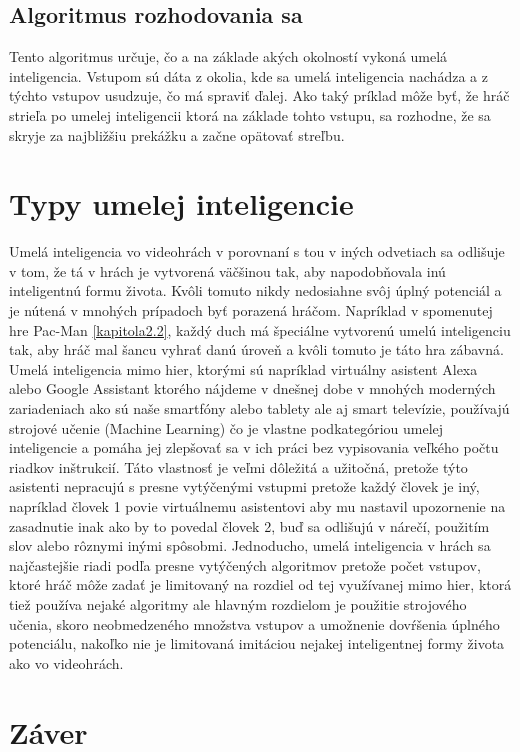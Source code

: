 \documentclass[10pt,oneside,slovak,a4paper]{article}
\begin{document}
\subsection{Algoritmus rozhodovania sa} \label{kapitola3.2}
Tento algoritmus určuje, čo a na základe akých okolností vykoná umelá inteligencia. Vstupom sú dáta z okolia, kde sa umelá inteligencia nachádza a z týchto vstupov usudzuje, čo má spraviť ďalej. Ako taký príklad môže byť, že hráč strieľa po umelej inteligencii ktorá na základe tohto vstupu, sa rozhodne, že sa skryje za najbližšiu prekážku a začne opätovať streľbu.


\section{Typy umelej inteligencie} \label{kapitola4}
Umelá inteligencia vo videohrách v porovnaní s tou v iných odvetiach sa odlišuje v tom, že tá v hrách je vytvorená väčšinou tak, aby napodobňovala inú inteligentnú formu života. Kvôli tomuto nikdy nedosiahne svôj úplný potenciál a je nútená v mnohých prípadoch byť porazená hráčom. Napríklad v spomenutej hre Pac-Man \ref{kapitola2.2}, každý duch má špeciálne vytvorenú umelú inteligenciu tak, aby hráč mal šancu vyhrať danú úroveň a kvôli tomuto je táto hra zábavná. Umelá inteligencia mimo hier, ktorými sú napríklad virtuálny asistent Alexa alebo Google Assistant ktorého nájdeme v dnešnej dobe v mnohých moderných zariadeniach ako sú naše smartfóny alebo tablety ale aj smart televízie, používajú strojové učenie (Machine Learning) čo je vlastne podkategóriou umelej inteligencie a pomáha jej zlepšovať sa v ich práci bez vypisovania veľkého počtu riadkov inštrukcií. Táto vlastnosť je veľmi dôležitá a užitočná, pretože týto asistenti nepracujú s presne vytýčenými vstupmi pretože každý človek je iný, napríklad človek 1 povie virtuálnemu asistentovi aby mu nastavil upozornenie na zasadnutie inak ako by to povedal človek 2, buď sa odlišujú v nárečí, použitím slov alebo rôznymi inými spôsobmi. Jednoducho, umelá inteligencia v hrách sa najčastejšie riadi podľa presne vytýčených algoritmov pretože počet vstupov, ktoré hráč môže zadať je limitovaný na rozdiel od tej využívanej mimo hier, ktorá tiež používa nejaké algoritmy ale hlavným rozdielom je použitie strojového učenia, skoro neobmedzeného množstva vstupov a umožnenie dovŕšenia úplného potenciálu, nakoľko nie je limitovaná imitáciou nejakej inteligentnej formy života ako vo videohrách.


\section{Záver} \label{zaver} %






\end{document}
